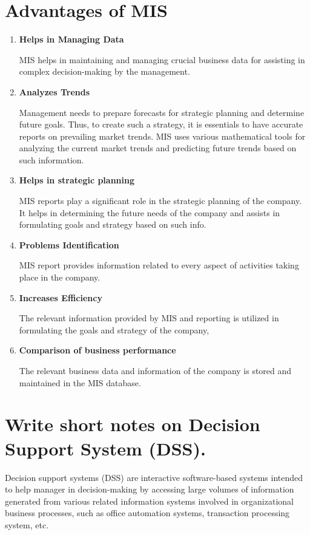 \documentclass[10pt]{article}
\begin{document}
\section{Advantages of MIS}
\begin{enumerate}
  \item \textbf{Helps in Managing Data}

    MIS helps in maintaining and managing crucial business data for assisting in complex 
    decision-making by the management.
  
  \item \textbf{Analyzes Trends}

    Management needs to prepare forecasts for strategic planning and determine future goals.
    Thus, to create such a strategy, it is essentials to have accurate reports on prevailing
    market trends. MIS uses various mathematical tools for analyzing the current market trends 
    and predicting future trends based on such information. 

  \item \textbf{Helps in strategic planning}

    MIS reports play a significant role in the strategic planning of the company. It helps 
    in determining the future needs of the company and assists in formulating goals and 
    strategy based on such info.

  \item \textbf{Problems Identification}

    MIS report provides information related to every aspect of activities taking place in the 
    company.

  \item \textbf{Increases Efficiency}

    The relevant information provided by MIS and reporting is utilized in formulating the goals
    and strategy of the company,

  \item \textbf{Comparison of business performance}
    
    The relevant business data and information of the company is stored and maintained in the 
    MIS database.

\end{enumerate}


\section{Write short notes on Decision Support System (DSS).}
Decision support systems (DSS) are interactive software-based systems intended to help manager 
in decision-making by accessing large volumes of information generated from various related
information systems involved in organizational business processes, such as office automation
systems, transaction processing system, etc.
\end{document}
